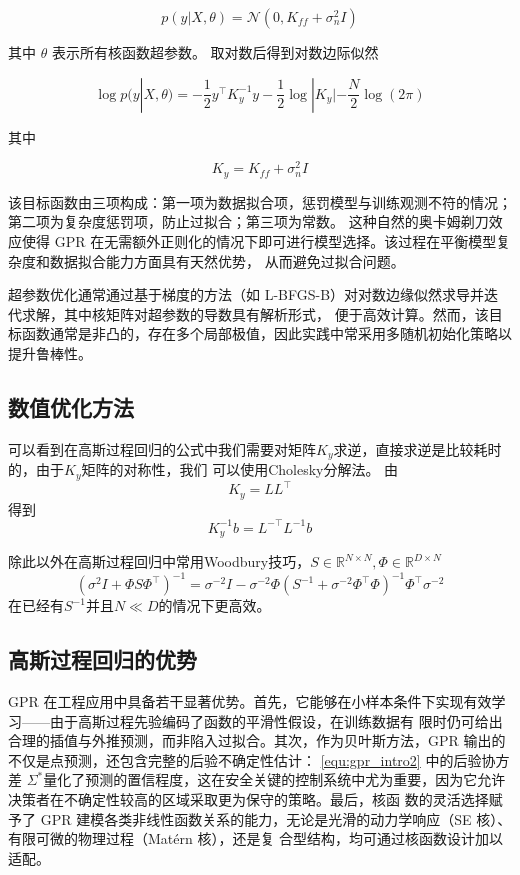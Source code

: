 \begin{equation}
p(y|X,\theta) =
\mathcal N
(0, K_{ff} + \sigma_n^2 I)
\end{equation}

其中 $\theta$ 表示所有核函数超参数。
取对数后得到对数边际似然

\begin{equation}
\log p(y|X,\theta)
=
-\frac{1}{2} y^\top K_y^{-1} y
-\frac{1}{2} \log |K_y|
-\frac{N}{2}\log(2\pi)
\end{equation}

其中

\begin{equation}
K_y = K_{ff} + \sigma_n^2 I
\end{equation}

该目标函数由三项构成：第一项为数据拟合项，惩罚模型与训练观测不符的情况；第二项为复杂度惩罚项，防止过拟合；第三项为常数。
这种自然的奥卡姆剃刀效应使得 GPR 在无需额外正则化的情况下即可进行模型选择。该过程在平衡模型复杂度和数据拟合能力方面具有天然优势，
从而避免过拟合问题。

超参数优化通常通过基于梯度的方法（如 L-BFGS-B）对对数边缘似然求导并迭代求解，其中核矩阵对超参数的导数具有解析形式，
便于高效计算。然而，该目标函数通常是非凸的，存在多个局部极值，因此实践中常采用多随机初始化策略以提升鲁棒性。

\subsection{数值优化方法}

可以看到在高斯过程回归的公式中我们需要对矩阵$K_y$求逆，直接求逆是比较耗时的，由于$K_y$矩阵的对称性，我们
可以使用Cholesky\cite{Wikipedia_Cholesky}分解法。
由
\begin{equation}
    K_y = L L^\top 
\end{equation}
得到
\begin{equation}
    K_y^{-1} b = L^{-\top} L^{-1} b
\end{equation}

除此以外在高斯过程回归中常用Woodbury\cite{Wikipedia_Woodbury}技巧，$S \in \mathbb R^{N \times N}, \Phi \in \mathbb R^{D \times N}$
\begin{equation}
    (\sigma^2 I + \Phi S \Phi^\top)^{-1} = \sigma^{-2} I - \sigma^{-2} \Phi (S^{-1} + \sigma^{-2} \Phi^\top \Phi)^{-1}
    \Phi^\top \sigma^{-2}
\end{equation}
在已经有$S^{-1}$并且$N \ll D$的情况下更高效。

\subsection{高斯过程回归的优势}
GPR 在工程应用中具备若干显著优势。首先，它能够在小样本条件下实现有效学习——由于高斯过程先验编码了函数的平滑性假设，在训练数据有
限时仍可给出合理的插值与外推预测，而非陷入过拟合。其次，作为贝叶斯方法，GPR 输出的不仅是点预测，还包含完整的后验不确定性估计：
\autoref{equ:gpr_intro2} 中的后验协方差 $\Sigma^*
$量化了预测的置信程度，这在安全关键的控制系统中尤为重要，因为它允许决策者在不确定性较高的区域采取更为保守的策略。最后，核函
数的灵活选择赋予了 GPR 建模各类非线性函数关系的能力，无论是光滑的动力学响应（SE 核）、有限可微的物理过程（Matérn 核），还是复
合型结构，均可通过核函数设计加以适配。

